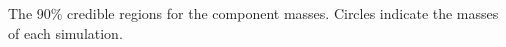 \label{fig:comp-masses} The 90\% credible regions for the component masses.  Circles indicate the masses of each simulation.